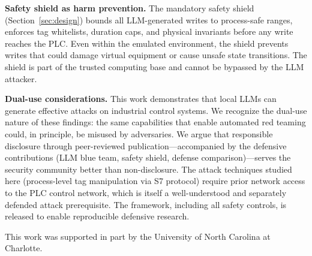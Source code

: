 \documentclass[journal]{IEEEtran}
\begin{document}
\textbf{Safety shield as harm prevention.} The mandatory safety shield (Section~\ref{sec:design}) bounds all LLM-generated writes to process-safe ranges, enforces tag whitelists, duration caps, and physical invariants before any write reaches the PLC. Even within the emulated environment, the shield prevents writes that could damage virtual equipment or cause unsafe state transitions. The shield is part of the trusted computing base and cannot be bypassed by the LLM attacker.

\textbf{Dual-use considerations.} This work demonstrates that local LLMs can generate effective attacks on industrial control systems. We recognize the dual-use nature of these findings: the same capabilities that enable automated red teaming could, in principle, be misused by adversaries. We argue that responsible disclosure through peer-reviewed publication---accompanied by the defensive contributions (LLM blue team, safety shield, defense comparison)---serves the security community better than non-disclosure. The attack techniques studied here (process-level tag manipulation via S7 protocol) require prior network access to the PLC control network, which is itself a well-understood and separately defended attack prerequisite. The framework, including all safety controls, is released to enable reproducible defensive research.

This work was supported in part by the University of North Carolina at Charlotte.





\end{document}

